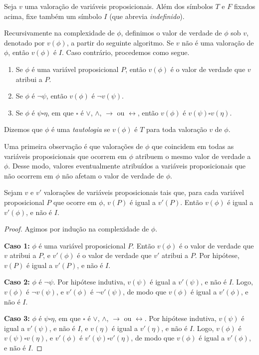 \begin{metadefinition}\label{mdef:valorVerdadeFormulaProposicional}Seja $v$ uma valoração de variáveis proposicionais.
    Além dos símbolos $T$ e $F$ fixados acima, fixe também um símbolo $I$ (que abrevia \emph{indefinido}).

    Recursivamente na complexidade de $\phi$, definimos o valor de verdade de $\phi$ sob $v$, denotado por $v(\phi)$, a partir do seguinte algoritmo.
    Se $v$ não é uma valoração de $\phi$, então $v(\phi)$ é $I$.
    Caso contrário, procedemos como segue.
    \begin{enumerate}
        \item Se $\phi$ é uma variável proposicional $P$, então $v(\phi)$ é o valor de verdade que $v$ atribui a $P$.
        \item Se $\phi$ é $\neg \psi$, então $v(\phi)$ é $\neg v(\psi)$.
        \item Se $\phi$ é $ \psi \square \eta$, em que $\square$ é $\vee$, $\wedge$, $\rightarrow$ ou $\leftrightarrow$, então $v(\phi)$ é $v(\psi) \square v(\eta)$.
    \end{enumerate}
    Dizemos que $\phi$ é uma \emph{tautologia} se $v(\phi)$ é $T$ para toda valoração $v$ de $\phi$.
\end{metadefinition}

Uma primeira observação é que valorações de $\phi$ que coincidem em todas as variáveis proposicionais que ocorrem em $\phi$ atribuem o mesmo valor de verdade a $\phi$.
Desse modo, valores eventualmente atribuídos a variáveis proposicionais que não ocorrem em $\phi$ não afetam o valor de verdade de $\phi$.

\begin{metalemma}
    Sejam $v$ e $v'$ valorações de variáveis proposicionais tais que, para cada variável proposicional $P$ que ocorre em $\phi$, $v(P)$ é igual a $v'(P)$.
    Então $v(\phi)$ é igual a $v'(\phi)$, e não é $I$.
\end{metalemma}
\begin{proof}
    Agimos por indução na complexidade de $\phi$.

    \textbf{Caso 1:} $\phi$ é uma variável proposicional $P$.
    Então $v(\phi)$ é o valor de verdade que $v$ atribui a $P$, e $v'(\phi)$ é o valor de verdade que $v'$ atribui a $P$.
    Por hipótese, $v(P)$ é igual a $v'(P)$, e não é $I$.

    \textbf{Caso 2:} $\phi$ é $\neg \psi$.
    Por hipótese indutiva, $v(\psi)$ é igual a $v'(\psi)$, e não é $I$.
    Logo, $v(\phi)$ é $\neg v(\psi)$, e $v'(\phi)$ é $\neg v'(\psi)$, de modo que $v(\phi)$ é igual a $v'(\phi)$, e não é $I$.

    \textbf{Caso 3:} $\phi$ é $ \psi \square \eta$, em que $\square$ é $\vee$, $\wedge$, $\rightarrow$ ou $\leftrightarrow$.
    Por hipótese indutiva, $v(\psi)$ é igual a $v'(\psi)$, e não é $I$, e $v(\eta)$ é igual a $v'(\eta)$, e não é $I$.
    Logo, $v(\phi)$ é $v(\psi) \square v(\eta)$, e $v'(\phi)$ é $v'(\psi) \square v'(\eta)$, de modo que $v(\phi)$ é igual a $v'(\phi)$, e não é $I$.
\end{proof}

